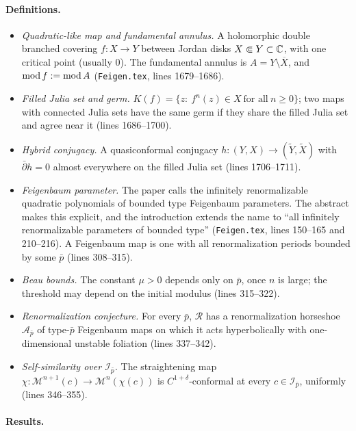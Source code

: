\paragraph{Definitions.}
\begin{itemize}
\item \emph{Quadratic-like map and fundamental annulus.}  A holomorphic double branched covering
$f\colon X\to Y$ between Jordan disks $X\Subset Y\subset\mathbb C$, with one critical point (usually $0$).  The fundamental
annulus is $A=Y\setminus\overline X$, and $\operatorname{mod} f:=\operatorname{mod} A$ (\texttt{Feigen.tex}, lines 1679--1686).
\item \emph{Filled Julia set and germ.}  $K(f)=\{z:\ f^n(z)\in X\ \text{for all}\ n\ge0\}$; two maps with
connected Julia sets have the same germ if they share the filled Julia set and agree near it
(lines 1686--1700).
\item \emph{Hybrid conjugacy.}  A quasiconformal conjugacy $h\colon(Y,X)\to(\widetilde Y,\widetilde X)$ with
$\bar\partial h=0$ almost everywhere on the filled Julia set (lines 1706--1711).
\item \emph{Feigenbaum parameter.}  The paper calls the infinitely renormalizable quadratic polynomials of bounded type
Feigenbaum parameters.  The abstract makes this explicit, and the introduction extends the name to ``all infinitely
renormalizable parameters of bounded type'' (\texttt{Feigen.tex}, lines 150--165 and 210--216).  A Feigenbaum map is
one with all renormalization periods bounded by some $\bar p$ (lines 308--315).
\item \emph{Beau bounds.}  The constant $\mu>0$ depends only on $\bar p$, once $n$ is large; the threshold may
depend on the initial modulus (lines 315--322).
\item \emph{Renormalization conjecture.}  For every $\bar p$, $\mathcal R$ has a renormalization horseshoe
$\mathcal A_{\bar p}$ of type-$\bar p$ Feigenbaum maps on which it acts hyperbolically with one-dimensional
unstable foliation (lines 337--342).
\item \emph{Self-similarity over $\mathcal I_{\bar p}$.}  The straightening map
$\chi\colon\mathcal M^{n+1}(c)\to\mathcal M^n(\chi(c))$ is $C^{1+\delta}$-conformal at every $c\in\mathcal I_{\bar p}$,
uniformly (lines 346--355).
\end{itemize}

\paragraph{Results.}

